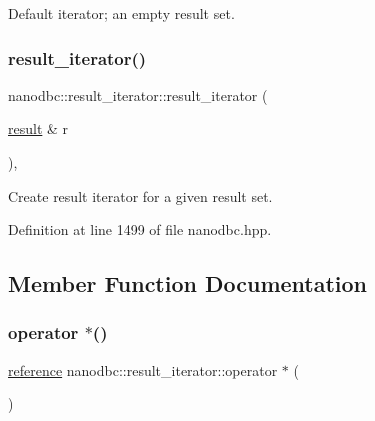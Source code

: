 Default iterator; an empty result set. 

\mbox{\label{classnanodbc_1_1result__iterator_af0cd8c4ea131a971a4ee616fde1a8eca}} 
\subsubsection{\texorpdfstring{result\_iterator()}{result\_iterator()}\hspace{0.1cm}{\footnotesize\ttfamily [2/2]}}
{\footnotesize\ttfamily nanodbc\+::result\+\_\+iterator\+::result\+\_\+iterator (\begin{DoxyParamCaption}\item[{\mbox{\hyperlink{classnanodbc_1_1result}{result}} \&}]{r }\end{DoxyParamCaption})\hspace{0.3cm}{\ttfamily [inline]}, {\ttfamily [explicit]}}



Create result iterator for a given result set. 



Definition at line 1499 of file nanodbc.\+hpp.



\subsection{Member Function Documentation}
\mbox{\label{classnanodbc_1_1result__iterator_ab64d4ba85df82d3bf472611b14e47b4e}} 
\subsubsection{\texorpdfstring{operator $\ast$()}{operator *()}}
{\footnotesize\ttfamily \mbox{\hyperlink{classnanodbc_1_1result__iterator_aeca21fe535e223231562d96a76c5ee92}{reference}} nanodbc\+::result\+\_\+iterator\+::operator $\ast$ (\begin{DoxyParamCaption}{ }\end{DoxyParamCaption})\hspace{0.3cm}{\ttfamily [inline]}}



